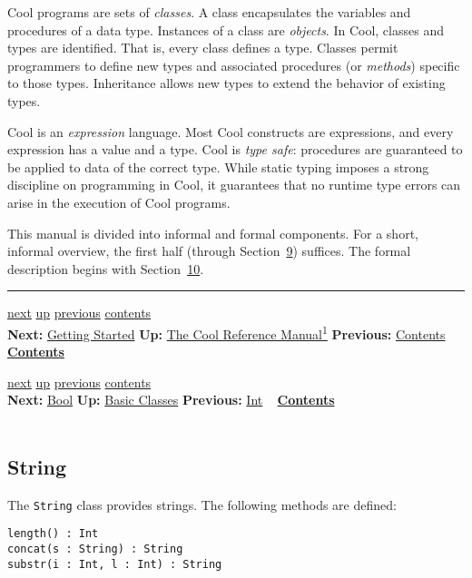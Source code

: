 \documentclass[]{article}
\begin{document}
Cool programs are sets of \emph{classes}. A class encapsulates the
variables and procedures of a data type. Instances of a class are
\emph{objects}. In Cool, classes and types are identified. That is,
every class defines a type. Classes permit programmers to define new
types and associated procedures (or \emph{methods}) specific to those
types. Inheritance allows new types to extend the behavior of existing
types.

Cool is an \emph{expression} language. Most Cool constructs are
expressions, and every expression has a value and a type. Cool is
\emph{type safe}: procedures are guaranteed to be applied to data of the
correct type. While static typing imposes a strong discipline on
programming in Cool, it guarantees that no runtime type errors can arise
in the execution of Cool programs.

This manual is divided into informal and formal components. For a short,
informal overview, the first half (through
Section~\href{node32.html\#sec-main}{9}) suffices. The formal
description begins with Section~\href{node33.html\#lex-struct}{10}.

\begin{center}\rule{3in}{0.4pt}\end{center}

\href{node3.html}{next} \href{cool-manual.html}{up}
\href{node1.html}{previous} \href{node1.html}{contents} \\
\textbf{Next:} \href{node3.html}{Getting Started} \textbf{Up:}
\href{cool-manual.html}{The Cool Reference Manual\textsuperscript{1}}
\textbf{Previous:} \href{node1.html}{Contents} ~
\textbf{\href{node1.html}{Contents}}

\href{node31.html}{next} \href{node26.html}{up}
\href{node29.html}{previous} \href{node1.html}{contents} \\
\textbf{Next:} \href{node31.html}{Bool} \textbf{Up:}
\href{node26.html}{Basic Classes} \textbf{Previous:}
\href{node29.html}{Int} ~ \textbf{\href{node1.html}{Contents}} \\ \\

\subsection{String}

The \texttt{String} class provides strings. The following methods are
defined:

\begin{verbatim}
length() : Int
concat(s : String) : String
substr(i : Int, l : Int) : String
\end{verbatim}
\end{document}
